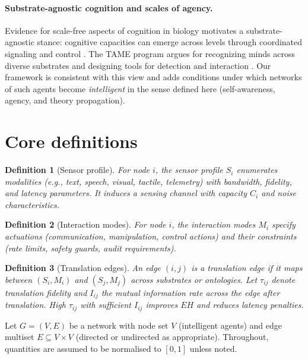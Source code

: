 \documentclass[12pt]{article}
\newtheorem{definition}{Definition}
\begin{document}
\paragraph{Substrate-agnostic cognition and scales of agency.}
Evidence for scale-free aspects of cognition in biology motivates a substrate-agnostic stance: cognitive capacities can emerge across levels through coordinated signaling and control \citep{Levin2019}. The TAME program argues for recognizing minds across diverse substrates and designing tools for detection and interaction \citep{TAME2021}. Our framework is consistent with this view and adds conditions under which networks of such agents become \emph{intelligent} in the sense defined here (self-awareness, agency, and theory propagation).\section{Core definitions}
\begin{definition}[Sensor profile]\label{def:sensors}
For node $i$, the \emph{sensor profile} $S_i$ enumerates modalities (e.g., text, speech, visual, tactile, telemetry) with bandwidth, fidelity, and latency parameters. It induces a sensing channel with capacity $C_i$ and noise characteristics.

\end{definition}

\begin{definition}[Interaction modes]\label{def:modes} For node $i$, the \emph{interaction modes} $M_i$ specify actuations (communication, manipulation, control actions) and their constraints (rate limits, safety guards, audit requirements).

\end{definition}

\begin{definition}[Translation edges]\label{def:translation}
An edge $(i,j)$ is a \emph{translation edge} if it maps between $(S_i,M_i)$ and $(S_j,M_j)$ across substrates or ontologies. Let $\tau_{ij}$ denote translation fidelity and $I_{ij}$ the mutual information rate across the edge after translation. High $\tau_{ij}$ with sufficient $I_{ij}$ improves $EH$ and reduces latency penalties.

\end{definition}

Let $G=(V,E)$ be a network with node set $V$ (intelligent agents) and edge multiset $E\subseteq V\times V$ (directed or undirected as appropriate). Throughout, quantities are assumed to be normalised to $[0,1]$ unless noted.
\end{document}
